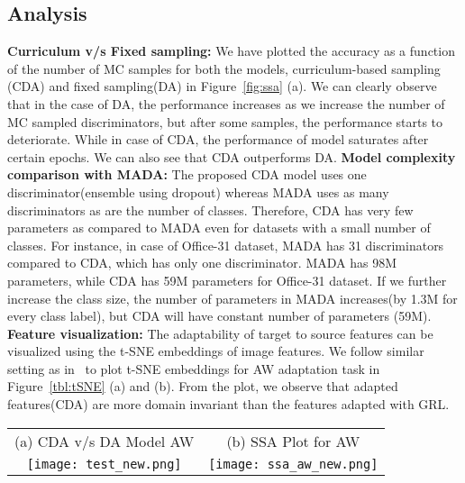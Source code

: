 \documentclass{bmvc2k}
\begin{document}
\subsection{Analysis}
\textbf{{Curriculum v/s Fixed sampling:}}
We have plotted the accuracy as a function of the number of MC samples for both the models, curriculum-based sampling (CDA) and fixed sampling\newline (DA) in Figure~\ref{fig:ssa} (a). We can clearly observe that in the case of DA, the performance increases as we increase the number of MC sampled discriminators, but after some samples, the performance starts to deteriorate. While in case of CDA, the performance of model saturates after certain epochs. We can also see that CDA outperforms DA.
\newline
\textbf{Model complexity comparison with MADA:}
The proposed CDA model uses one discriminator(ensemble using dropout) whereas MADA uses as many discriminators as are the number of classes. Therefore, CDA has very few parameters as compared to MADA even for datasets with a small number of classes. For instance, in case of Office-31 dataset, MADA has 31 discriminators compared to CDA, which has only one discriminator. MADA has 98M parameters, while CDA has 59M parameters for Office-31 dataset. If we further increase the class size, the number of parameters in MADA increases(by 1.3M for every class label), but  CDA will have constant number of parameters (59M). 
\newline
\textbf{{Feature visualization:}}
The adaptability  of target to source features can be visualized using the t-SNE embeddings of image features. We follow similar setting as in~\cite{ganin_ICML2015} to plot t-SNE embeddings for AW adaptation task in Figure~\ref{tbl:tSNE} (a) and (b). From the plot, we observe that adapted features(CDA) are more domain invariant than the features adapted with GRL.



\begin{figure*}[!]
 \small
\centering
 \begin{tabular}[b]{ c   c }
(a) CDA v/s DA Model  AW &  (b) SSA Plot for AW   \\
\texttt{[image: test\_new.png]} & 
\begin{minipage}[b][0.18\textheight][s]{0.30\textwidth}
  \centering
\texttt{[image: ssa\_aw\_new.png]}
\end{minipage}
\end{tabular}
  
\caption{(a) Accuracy v/s Number of MC samples for DA and CDA model. Note that in  DA model, each model is trained separately and reported accuracy after the training, while in  CDA model the accuracy is calculated with single training process (b) Analysis of statistically significant difference for A  W in Binary label Discriminator (GRL) \cite{ganin_ICML2015}, proposed model and Source only methods, with a significance level of 0.05.}
\label{fig:ssa}
\end{figure*}
\end{document}
